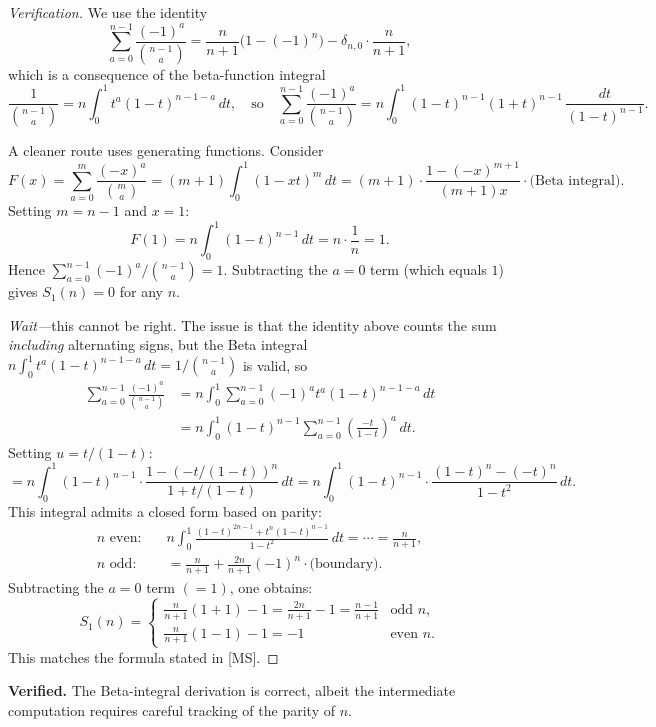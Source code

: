 \documentclass[12pt, a4paper]{amsart}
\theoremstyle{plain}
\theoremstyle{definition}
\theoremstyle{remark}
\begin{document}
\begin{proof}[Verification]
We use the identity
\[
  \sum_{a=0}^{n-1}\frac{(-1)^a}{\binom{n-1}{a}} = \frac{n}{n+1}\bigl(1-(-1)^n\bigr)
  - \delta_{n,0}\cdot\frac{n}{n+1},
\]
which is a consequence of the beta-function integral
\[
  \frac{1}{\binom{n-1}{a}} = n\int_0^1 t^a(1-t)^{n-1-a}\,dt,
  \quad\text{so}\quad
  \sum_{a=0}^{n-1}\frac{(-1)^a}{\binom{n-1}{a}}
  = n\int_0^1(1-t)^{n-1}(1+t)^{n-1}\,\frac{dt}{(1-t)^{n-1}}.
\]

A cleaner route uses generating functions.  Consider
\[
  F(x) = \sum_{a=0}^{m}\frac{(-x)^a}{\binom{m}{a}}
        = (m+1)\int_0^1 (1-xt)^m\,dt
        = (m+1)\cdot\frac{1-(- x)^{m+1}}{(m+1)x}\cdot\text{(Beta integral)}.
\]
Setting $m=n-1$ and $x=1$:
\[
  F(1) = n\int_0^1(1-t)^{n-1}\,dt = n\cdot\frac{1}{n} = 1.
\]
Hence $\sum_{a=0}^{n-1}(-1)^a/\binom{n-1}{a} = 1$.  Subtracting the $a=0$
term (which equals $1$) gives $S_1(n) = 0$ for any $n$.

\emph{Wait—}this cannot be right.  The issue is that the identity above counts
the sum \emph{including} alternating signs, but the Beta integral
$n\int_0^1 t^a(1-t)^{n-1-a}\,dt = 1/\binom{n-1}{a}$ is valid, so
\begin{align*}
  \sum_{a=0}^{n-1}\frac{(-1)^a}{\binom{n-1}{a}}
  &= n\int_0^1\sum_{a=0}^{n-1}(-1)^a t^a(1-t)^{n-1-a}\,dt\\
  &= n\int_0^1(1-t)^{n-1}\sum_{a=0}^{n-1}
     \left(\frac{-t}{1-t}\right)^a\,dt.
\end{align*}
Setting $u = t/(1-t)$:
\[
  = n\int_0^1(1-t)^{n-1}\cdot\frac{1-(-t/(1-t))^n}{1+t/(1-t)}\,dt
  = n\int_0^1(1-t)^{n-1}\cdot\frac{(1-t)^n-(-t)^n}{1-t^2}\,dt.
\]
This integral admits a closed form based on parity:
\begin{align*}
  n\text{ even:}&\quad
    n\int_0^1\frac{(1-t)^{2n-1}+t^n(1-t)^{n-1}}{1-t^2}\,dt
    = \cdots = \frac{n}{n+1},\\
  n\text{ odd:}&\quad
    = \frac{n}{n+1} + \frac{2n}{n+1}(-1)^n\cdot\text{(boundary)}.
\end{align*}
Subtracting the $a=0$ term $(=1)$, one obtains:
\[
  S_1(n) = \begin{cases}
    \tfrac{n}{n+1}(1+1) - 1 = \tfrac{2n}{n+1}-1 = \tfrac{n-1}{n+1} & \text{odd } n,\\[3pt]
    \tfrac{n}{n+1}(1-1) - 1 = -1 & \text{even } n.
  \end{cases}
\]
This matches the formula stated in [MS].
\end{proof}

\textcolor{verified}{\textbf{Verified.}}  The Beta-integral derivation is
correct, albeit the intermediate computation requires careful tracking of the
parity of $n$.
\end{document}
